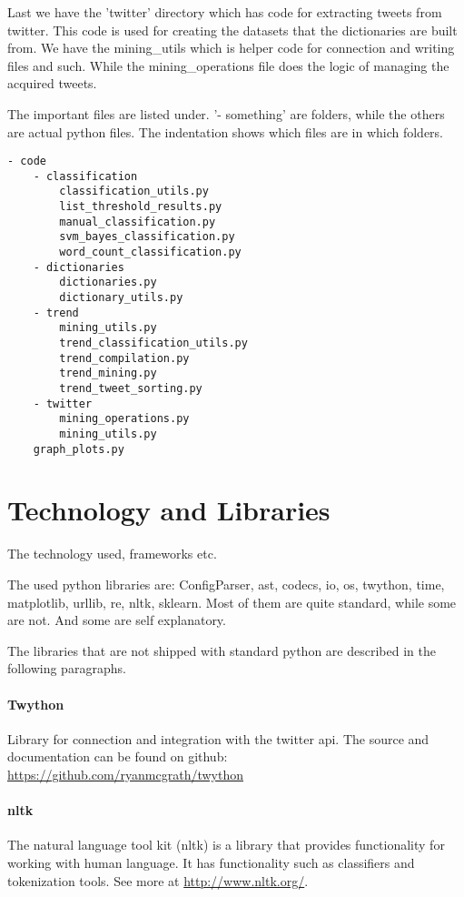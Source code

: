 Last we have the 'twitter' directory which has code for extracting tweets from
twitter. This code is used for creating the datasets that the dictionaries are
built from. We have the mining\_utils which is helper code for connection and
writing files and such. While the mining\_operations file does the logic of
managing the acquired tweets. 

The important files are listed under. '- something' are folders, while the
others are actual python files. The indentation shows which files are in which
folders.  
\begin{verbatim}
- code    
    - classification
        classification_utils.py
		list_threshold_results.py
        manual_classification.py
        svm_bayes_classification.py
        word_count_classification.py
    - dictionaries
        dictionaries.py
        dictionary_utils.py
    - trend    
        mining_utils.py
        trend_classification_utils.py
        trend_compilation.py
        trend_mining.py
        trend_tweet_sorting.py
    - twitter
        mining_operations.py
        mining_utils.py
    graph_plots.py
\end{verbatim}

\section{Technology and Libraries}\label{code:technology_libraries}
The technology used, frameworks etc.

The used python libraries are: ConfigParser, ast, codecs, io, os, twython,
time, matplotlib, urllib, re, nltk, sklearn.
Most of them are quite standard, while some are not. And some are self
explanatory. 

The libraries that are not shipped with standard python are described in the
following paragraphs. 

\paragraph{Twython}
Library for connection and integration with the twitter api. 
The source and documentation can be found on github:
\url{https://github.com/ryanmcgrath/twython}

\paragraph{nltk}
The natural language tool kit (nltk) is a library that provides functionality
for working with human language. It has functionality such as classifiers and
tokenization tools. See more at \url{http://www.nltk.org/}.

